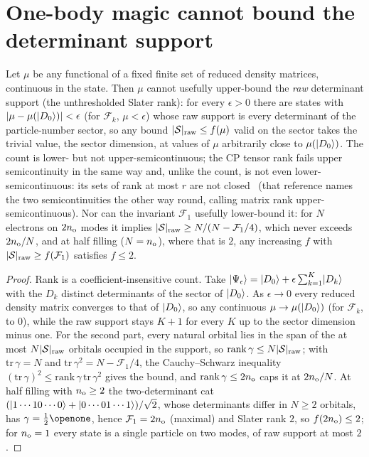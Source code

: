 \section{One-body magic cannot bound the determinant support}
\label{app:theorem}
\begin{proposition}
\label{prop:obstruction}
Let $\mu$ be any functional of a fixed finite set of reduced density matrices, continuous in the
state. Then $\mu$ cannot usefully upper-bound the \emph{raw} determinant support (the unthresholded
Slater rank): for every $\epsilon>0$ there are states with $|\mu-\mu(\lvert D_0 \rangle)|<\epsilon$ (for
$\mathcal F_k$, $\mu<\epsilon$) whose raw support is every determinant of the particle-number sector, so
any bound $|\mathcal S|_{\rm raw}\le f(\mu)$ valid on the sector takes the trivial value, the sector
dimension, at values of $\mu$ arbitrarily close to $\mu(\lvert D_0 \rangle)$. The count is lower- but not
upper-semicontinuous; the CP tensor rank fails upper semicontinuity in the same way and, unlike
the count, is not even lower-semicontinuous: its sets of rank at most $r$ are not
closed~\cite{desilvalim2008} (that reference names the two semicontinuities the other way round,
calling matrix rank upper-semicontinuous). Nor can the invariant $\mathcal F_1$ usefully lower-bound it:
for $N$ electrons on $2n_{\rm o}$ modes it implies $|\mathcal S|_{\rm raw}\ge N/(N-\mathcal F_1/4)$,
which never exceeds $2n_{\rm o}/N$, and at half filling ($N=n_{\rm o}$), where that is $2$, any
increasing $f$ with $|\mathcal S|_{\rm raw}\ge f(\mathcal F_1)$ satisfies $f\le2$.
\end{proposition}
\begin{proof}
Rank is a coefficient-insensitive count. Take
$\lvert \Psi_\epsilon \rangle=\lvert D_0 \rangle+\epsilon\sum_{k=1}^{K}\lvert D_k \rangle$ with the $D_k$ distinct determinants of
the sector of $\lvert D_0 \rangle$. As $\epsilon\to0$ every reduced density matrix converges to that of
$\lvert D_0 \rangle$, so any continuous $\mu\to\mu(\lvert D_0 \rangle)$ (for $\mathcal F_k$, to $0$), while the raw
support stays $K+1$ for every $K$ up to the sector dimension minus one. For the second part, every
natural orbital lies in the span of the at most $N|\mathcal S|_{\rm raw}$ orbitals occupied in the
support, so $\mathrm{rank}\,\gamma\le N|\mathcal S|_{\rm raw}$; with $\mathrm{tr}\,\gamma=N$ and
$\mathrm{tr}\,\gamma^{2}=N-\mathcal F_1/4$, the Cauchy--Schwarz inequality
$(\mathrm{tr}\,\gamma)^{2}\le\mathrm{rank}\,\gamma\,\mathrm{tr}\,\gamma^{2}$ gives the bound, and
$\mathrm{rank}\,\gamma\le2n_{\rm o}$ caps it at $2n_{\rm o}/N$. At half filling with $n_{\rm o}\ge2$ the two-determinant cat
$(\lvert 1\cdots10\cdots0 \rangle+\lvert 0\cdots01\cdots1 \rangle)/\sqrt2$, whose determinants differ in $N\ge2$ orbitals,
has $\gamma=\tfrac12\openone$, hence $\mathcal F_1=2n_{\rm o}$ (maximal) and Slater rank $2$, so
$f(2n_{\rm o})\le2$; for $n_{\rm o}=1$ every state is a single particle on two modes, of raw support at
most $2$.
\end{proof}
